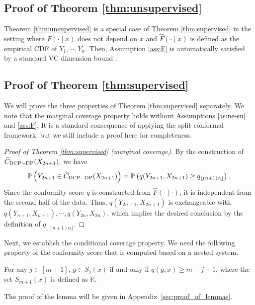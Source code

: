 \subsection{Proof of Theorem \ref{thm:unsupervised}}

Theorem \ref{thm:unsupervised} is a special case of Theorem \ref{thm:supervised} in the setting where $F(\cdot\mid x)$ does not depend on $x$ and $\widehat{F}(\cdot\mid x)$ is defined as the empirical CDF of $Y_1,\cdots,Y_n$. Then, Assumption \ref{ass:F} is automatically satisfied by a standard VC dimension bound \citep{devroye2001combinatorial}. 


\subsection{Proof of Theorem \ref{thm:supervised}}

We will prove the three properties of Theorem \ref{thm:supervised} separately. We note that the marginal coverage property holds without Assumptions \ref{as:ne-su} and \ref{ass:F}. It is a standard consequence of applying the split conformal framework, but we still include a proof here for completeness.

\begin{proof}[Proof of Theorem \ref{thm:supervised} (marginal coverage)]
By the construction of $\widehat{C}_{\rm DCP-DP}(X_{2n+1})$, we have
\begin{align*}
    \Pr\left(Y_{2n+1} \in \widehat{C}_{\rm DCP-DP}(X_{2n+1})\right) = \Pr \left(q(Y_{2n+1},X_{2n+1})\geq q_{\lfloor(n+1)\alpha\rfloor}\right).
\end{align*}
Since the conformity score $q$ is constructed from $\widehat{F}(\cdot \mid \cdot)$, it is independent from the second half of the data. 
Thus, $q(Y_{2n+1},X_{2n+1})$ is exchangeable with $q(Y_{n+1},X_{n+1}),\cdots, q(Y_{2n},X_{2n})$, which implies the desired conclusion by the definition of $q_{\lfloor(n+1)\alpha\rfloor}$.
\end{proof}

Next, we establish the conditional coverage property. We need the following property of the conformity score that is computed based on a nested system.
\begin{lemma}\label{lem:nest}
For any $j\in[m+1]$, $y\in S_j(x)$ if and only if $q(y,x)\geq m-j+1$, where the set $S_{m+1}(x)$ is defined as $\mathbb{R}$.
\end{lemma}


The proof of the lemma will be given in Appendix~\ref{sec:proof_of_lemmas}.

